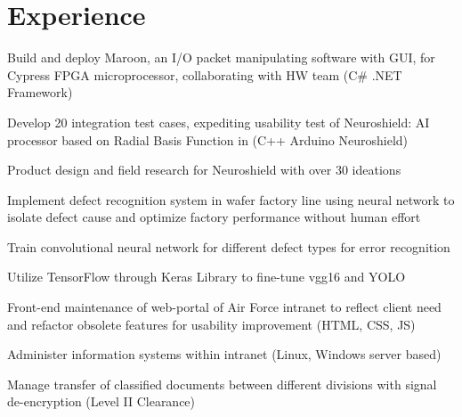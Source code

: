 \documentclass[]{deedy-resume-openfont}
\begin{document}
\begin{minipage}[t]{0.30\textwidth}
%
%

\end{minipage} 
\hfill
\begin{minipage}[t]{0.69\textwidth} %


\section{Experience}

 \descript{|}
\vspace{\topsep}
\begin{tightemize}
\item Build and deploy Maroon, an I/O packet manipulating software with GUI, for Cypress FPGA microprocessor, collaborating with HW team (C\# .NET Framework)
\item Develop 20 integration test cases, expediting usability test of Neuroshield: AI processor based on Radial Basis Function in (C++ Arduino Neuroshield)
\item Product design and field research for Neuroshield with over 30 ideations 
\end{tightemize}
\sectionsep

 \descript{|}
\begin{tightemize}
\item Implement defect recognition system in wafer factory line using neural network to isolate defect cause and optimize factory performance without human effort
\item Train convolutional neural network for different defect types for error recognition
\item Utilize TensorFlow through Keras Library to fine-tune vgg16 and YOLO 
\end{tightemize}
\sectionsep

 \descript{|}
\begin{tightemize}
\item Front-end maintenance of web-portal of Air Force intranet to reflect client need and refactor obsolete features for usability improvement (HTML, CSS, JS)
\item Administer information systems within intranet (Linux, Windows server based)
\item Manage transfer of classified documents between different divisions with signal de-encryption (Level II Clearance)
\end{tightemize}
\sectionsep


\end{minipage}
\end{document}
